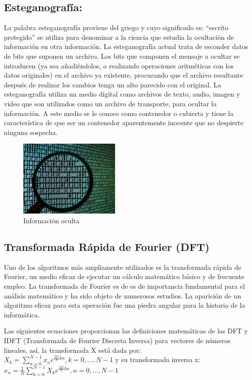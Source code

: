 \documentclass[12pt]{article}
\begin{document}
\subsection{Esteganografía:}
La palabra esteganografía proviene del griego y cuyo significado es: “escrito protegido” se utiliza para denominar a la ciencia que estudia la ocultación de información en otra información. La esteganografía actual trata de esconder datos de bits que suponen un archivo. Los bits que componen el mensaje a ocultar se introducen (ya sea añadiéndolos, o realizando operaciones aritméticas con los datos originales) en el archivo ya existente, procurando que el archivo resultante después de realizar los cambios tenga un alto parecido con el original. La esteganografía utiliza un medio digital como archivos de texto, audio, imagen y video que son utilizados como un archivo de transporte, para ocultar la información. A este medio se le conoce como contenedor o cubierta y tiene la característica de que ser un contenedor aparentemente inocente que no despierte ninguna sospecha. \cite{Chavez}
\newline
\begin{figure}[hbtp]
\centering
\includegraphics[width = 5cm]{esteganografia.jpeg}
\caption{Información oculta}
\end{figure}

\subsection{Transformada Rápida de Fourier (DFT)}
Uno de los algoritmos más ampliamente utilizados es la transformada rápida de Fourier, un medio eficaz de ejecutar un cálculo matemático básico y de frecuente empleo. La transformada de Fourier es de es de importancia fundamental para el análisis matemático y ha sido objeto de numerosos estudios. La aparición de un algoritmo eficaz para esta operación fue una piedra angular para la historia de la informática.

Las siguientes ecuaciones proporcionan las definiciones matemáticas de las DFT y IDFT (Transformada de Fourier Discreta Inversa) para vectores de números lineales, así, la transformada X está dada por:
\newline
\textbf {
	$X_k = \sum_{n=0}^{N-1}x_ne^{\frac{2{\pi}i}{N}kn}, k = 0,..., N - 1$
}
\newline
y su transformada  inversa x:
\newline
\textbf {
	$x_n = \frac{1}{N}\sum_{k=0}^{N-1}X_ke^{\frac{2{\pi}i}{N}kn}, n = 0,..., N - 1$
}
\newline
\cite{Sedgewic}
\end{document}
